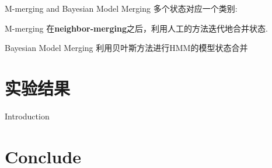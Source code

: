 \documentclass{beamer}
\begin{document}
\begin{frame}{M-merging and Bayesian Model Merging}
多个状态对应一个类别:
\begin{block}{M-merging}
    在\textbf{neighbor-merging}之后，利用人工的方法迭代地合并状态.    
\end{block}

\begin{block}{Bayesian Model Merging}
    利用贝叶斯方法进行HMM的模型状态合并
\end{block}
\end{frame}

\section{实验结果}
\begin{frame}{Introduction}

\end{frame}

\section{Conclude}
\end{document}
